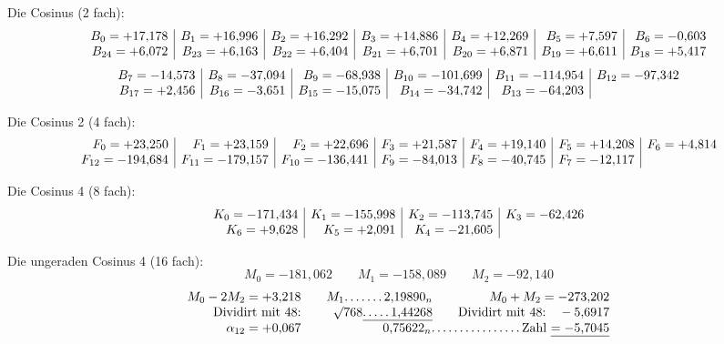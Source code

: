 \begin{landscape}
\[\]
\par\noindent\hspace*{\parindent}Die Cosinus (2 fach):
\[
\begin{array}{@{}r|r|r|r|r|r|r@{}}
B_0=+17{,}178&B_1=+16{,}996&B_2=+16{,}292&B_3=+14{,}886&B_4=+12{,}269&B_5=+7{,}597&B_6=-0{,}603\\
B_{24}=+6{,}072&B_{23}=+6{,}163&B_{22}=+6{,}404&B_{21}=+6{,}701&B_{20}=+6{,}871&B_{19}=+6{,}611&B_{18}=+5{,}417
\end{array}
\]
\[
\begin{array}{@{}r|r|r|r|r|r@{}}
B_7=-14{,}573&B_8=-37{,}094&B_9=-68{,}938&B_{10}=-101{,}699&B_{11}=-114{,}954&B_{12}=-97{,}342\\
B_{17}=+2{,}456&B_{16}=-3{,}651&B_{15}=-15{,}075&B_{14}=-34{,}742&B_{13}=-64{,}203&
\end{array}
\]
\par\noindent\hspace*{\parindent}Die Cosinus 2 (4 fach):
\[
\begin{array}{@{}r|r|r|r|r|r|r@{}}
F_0=+23{,}250&F_1=+23{,}159&F_2=+22{,}696&F_3=+21{,}587&F_4=+19{,}140&F_5=+14{,}208&F_6=+4{,}814\\
F_{12}=-194{,}684&F_{11}=-179{,}157&F_{10}=-136{,}441&F_9=-84{,}013&F_8=-40{,}745&F_7=-12{,}117&
\end{array}
\]
\newcommand{\VfourDots}[1]{\begingroup\count255=#1\relax\loop\mathord{.}\,\advance\count255 by -1\ifnum\count255>0\repeat\endgroup}
\clearpage{}
\par\noindent\hspace*{\parindent}Die Cosinus 4 (8 fach):
\[
\begin{array}{@{}r|r|r|r@{}}
K_0=-171{,}434&K_1=-155{,}998&K_2=-113{,}745&K_3=-62{,}426\\
K_6=+9{,}628&K_5=+2{,}091&K_4=-21{,}605&
\end{array}
\]
\par\noindent\hspace*{\parindent}Die ungeraden Cosinus 4 (16 fach):
\[M_0=-181{,}062\qquad M_1=-158{,}089\qquad M_2=-92{,}140\]
\[
\begin{array}{@{}r@{\qquad}r@{\qquad}r@{}}
M_0-2M_2=+3{,}218&M_1\VfourDots{6}2{,}19890_n&M_0+M_2=-273{,}202\\
\text{Dividirt mit 48:}&\BareRoot{768}\underline{\VfourDots{4}1{,}44268}&\text{Dividirt mit 48:}\quad-5{,}6917\\
\alpha_{12}=+0{,}067&\multicolumn{2}{r@{}}{0{,}75622_n\VfourDots{15}\text{Zahl}\ \underline{= -5{,}7045}}\\

\end{array}\]
\end{landscape}
